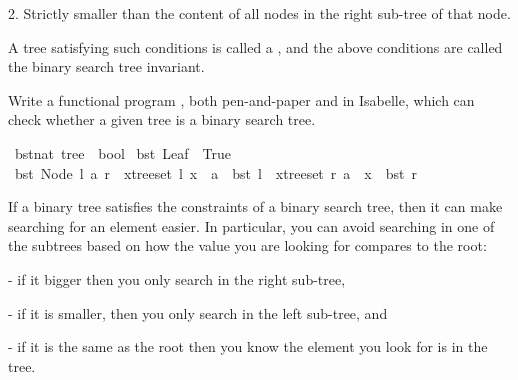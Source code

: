 \begin{isabellebody}
\begin{isamarkuptext}
     2. Strictly smaller than the content of all nodes in the right sub-tree  of that node.

    A tree satisfying such conditions is called a , and the above conditions
    are called the binary search tree invariant.

    Write a functional program , both pen-and-paper and in Isabelle, which can check whether a given
    tree is a binary search tree.%
\end{isamarkuptext}\isamarkuptrue%
\isamarkupfalse%
\ bst{\isacharcolon}{\kern0pt}{\isacharcolon}{\kern0pt}{\isachardoublequoteopen}nat\ tree\ {\isasymRightarrow}\ bool{\isachardoublequoteclose}\ \isanewline
\isanewline
{\isachardoublequoteopen}bst\ Leaf\ {\isacharequal}{\kern0pt}\ True{\isachardoublequoteclose}\isanewline
{\isacharbar}{\kern0pt}\ {\isachardoublequoteopen}bst\ {\isacharparenleft}{\kern0pt}Node\ l\ a\ r{\isacharparenright}{\kern0pt}\ {\isacharequal}{\kern0pt}\ {\isacharparenleft}{\kern0pt}{\isacharparenleft}{\kern0pt}{\isasymforall}x{\isasymin}tree{\isacharunderscore}{\kern0pt}set\ l{\isachardot}{\kern0pt}\ x\ {\isacharless}{\kern0pt}\ a{\isacharparenright}{\kern0pt}\ {\isasymand}\ bst\ l\ {\isasymand}\ {\isacharparenleft}{\kern0pt}{\isasymforall}x{\isasymin}tree{\isacharunderscore}{\kern0pt}set\ r{\isachardot}{\kern0pt}\ a\ {\isacharless}{\kern0pt}\ x{\isacharparenright}{\kern0pt}\ {\isasymand}\ bst\ r{\isacharparenright}{\kern0pt}{\isachardoublequoteclose}%
\begin{isamarkuptext}%
%
\end{isamarkuptext}\isamarkuptrue%
%
\begin{isamarkuptext}%
If a binary tree satisfies the constraints of a binary search tree, then it can make searching 
   for an element easier. In particular, you can avoid searching in one of the subtrees based on 
   how the value you are looking for compares to the root:
    
    - if it bigger then you only search in the right sub-tree,

    - if it is smaller, then you only search in the left sub-tree, and

    - if it is the same as the root then you know the element you look for is in the tree. 


\end{isamarkuptext}
\end{isabellebody}
